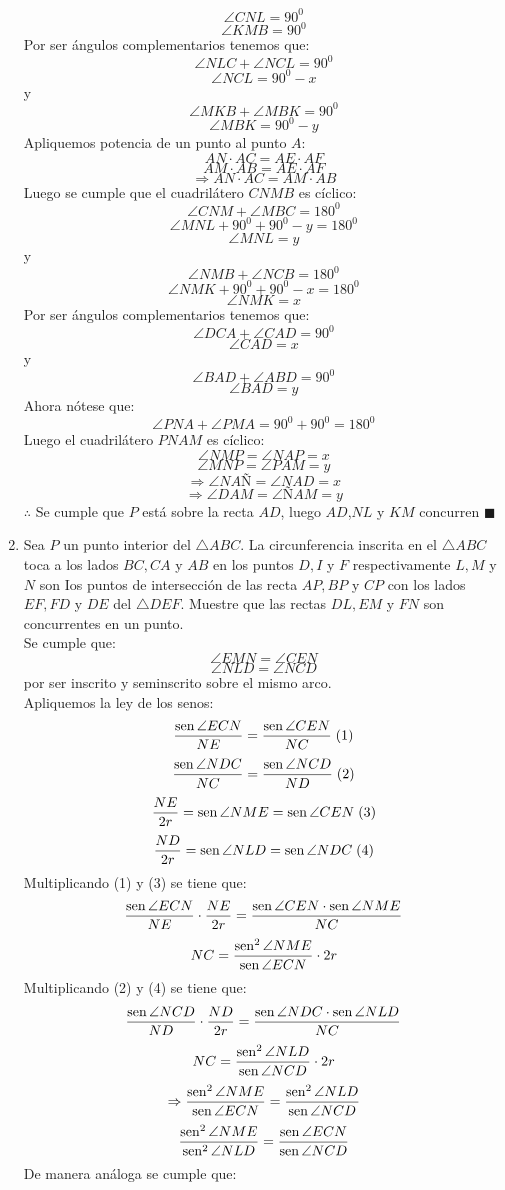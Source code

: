 \documentclass{book}
\newcommand{\sen}{\mathop{\rm sen}\nolimits} %
\begin{document}
\begin{enumerate}
$$\angle CNL=90^0$$
$$\angle KMB=90^0$$
Por ser ángulos complementarios tenemos que:
$$\angle NLC+\angle NCL=90^0$$
$$\angle NCL=90^0-x$$
y
$$\angle MKB+\angle MBK=90^0$$
$$\angle MBK=90^0-y$$
Apliquemos potencia de un punto al punto $A$:
$$AN\cdot AC=AE\cdot AF$$
$$AM\cdot AB=AE\cdot AF$$
$$\Rightarrow AN\cdot AC=AM\cdot AB$$
Luego se cumple que el cuadrilátero $CNMB$ es cíclico:
$$\angle CNM+\angle MBC=180^0$$
$$\angle MNL+90^0+90^0-y=180^0$$
$$\angle MNL=y$$
y
$$\angle NMB+\angle NCB=180^0$$
$$\angle NMK+90^0+90^0-x=180^0$$
$$\angle NMK=x$$
Por ser ángulos complementarios tenemos que:
$$\angle DCA+\angle CAD=90^0$$
$$\angle CAD=x$$
y
$$\angle BAD+\angle ABD=90^0$$
$$\angle BAD=y$$
Ahora nótese que:
$$\angle PNA+\angle PMA=90^0+90^0=180^0$$
Luego el cuadrilátero $PNAM$ es cíclico:
$$\angle NMP=\angle NAP=x$$
$$\angle MNP=\angle PAM=y$$
$$\Rightarrow\angle NAÑ=\angle NAD=x$$
$$\Rightarrow\angle DAM=\angle ÑAM=y$$
$\therefore$ Se cumple que $P$ está sobre la recta $AD$, luego $AD$,$NL$ y $KM$ concurren $\blacksquare$\\
				\item Sea $P$ un punto interior del $\triangle ABC$. La circunferencia inscrita en el $\triangle ABC$ toca a los lados $BC,CA$ y $AB$ en los puntos $D,I$ y $F$ respectivamente $L,M$ y $N$ son Ios puntos de intersección de las recta $AP,BP$ y $CP$ con los lados $EF,FD$ y $DE$ del $\triangle DEF$. Muestre que las rectas $DL,EM$ y $FN$ son concurrentes en un punto.\\
					Se cumple que:
					$$\angle EMN=\angle CEN$$
$$\angle NLD=\angle NCD$$
por ser inscrito y seminscrito sobre el mismo arco.\\
Apliquemos la ley de los senos:
$${\sen {\angle ECN}\over NE}={\sen {\angle CEN}\over NC} \; (1)$$
$${\sen {\angle NDC}\over NC}={\sen {\angle NCD}\over ND} \; (2)$$
$${NE\over 2r}=\sen {\angle NME}=\sen {\angle CEN}\; (3)$$
$${ND\over 2r}=\sen {\angle NLD}=\sen {\angle NDC}\; (4)$$
Multiplicando (1) y (3) se tiene que:
$${\sen {\angle ECN}\over NE}\cdot{ NE\over 2r}={\sen {\angle CEN}\cdot \sen {\angle NME}\over NC}  $$
$$NC={\sen^2  {\angle NME}\over\sen {\angle ECN}}\cdot 2r$$
Multiplicando (2) y (4) se tiene que:
$${\sen {\angle NCD}\over ND}\cdot{ND\over 2r}={\sen {\angle NDC}\cdot\sen {\angle NLD}\over NC}$$
$$NC={\sen^2  {\angle NLD}\over\sen {\angle NCD}}\cdot 2r$$
$$\Rightarrow{\sen^2  {\angle NME}\over\sen {\angle ECN}}={\sen^2  {\angle NLD}\over\sen {\angle NCD}}$$
$${\sen^2  {\angle NME}\over\sen^2  {\angle NLD}}={\sen {\angle ECN}\over\sen {\angle NCD}}$$
De manera análoga se cumple que:

\end{enumerate}
\end{document}
